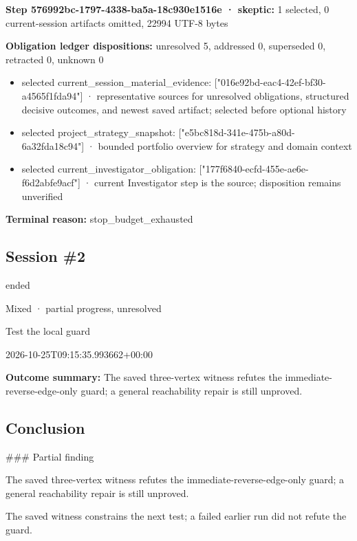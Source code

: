 \documentclass[11pt]{article}
\begin{document}
\textbf{Step 576992bc-1797-4338-ba5a-18c930e1516e · skeptic:} 1 selected, 0 current-session artifacts omitted, 22994 UTF-8 bytes\par
\textbf{Obligation ledger dispositions:} unresolved 5, addressed 0, superseded 0, retracted 0, unknown 0\par
\begin{itemize}
\item selected current\_session\_material\_evidence: ["016e92bd-eac4-42ef-bf30-a4565f1fda94"] · representative sources for unresolved obligations, structured decisive outcomes, and newest saved artifact; selected before optional history
\item selected project\_strategy\_snapshot: ["e5bc818d-341e-475b-a80d-6a32fda18c94"] · bounded portfolio overview for strategy and domain context
\item selected current\_investigator\_obligation: ["177f6840-ecfd-455e-ae6e-f6d2abfe9acf"] · current Investigator step is the source; disposition remains unverified
\end{itemize}
\textbf{Terminal reason:} stop\_budget\_exhausted\par
\subsection{Session \#2}
\begin{description}[style=nextline,font=\normalfont\bfseries,leftmargin=0pt,labelsep=0pt]
\item[Execution status] ended
\item[Outcome] Mixed · partial progress, unresolved
\item[Strategy] Test the local guard
\item[Started] 2026-10-25T09:15:35.993662+00:00
\end{description}
\textbf{Outcome summary:} The saved three-vertex witness refutes the immediate-reverse-edge-only guard; a general reachability repair is still unproved.\par
\subsection{Conclusion}
\#\#\# Partial finding

The saved three-vertex witness refutes the immediate-reverse-edge-only guard; a general reachability repair is still unproved.

The saved witness constrains the next test; a failed earlier run did not refute the guard.
\end{document}
